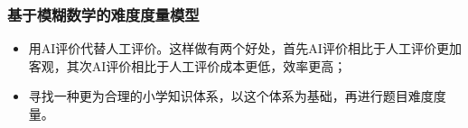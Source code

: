 \subsubsection{基于模糊数学的难度度量模型}

\begin{itemize}
    \item 用AI评价代替人工评价。这样做有两个好处，首先AI评价相比于人工评价更加客观，其次AI评价相比于人工评价成本更低，效率更高；
    \item 寻找一种更为合理的小学知识体系，以这个体系为基础，再进行题目难度度量。
\end{itemize}